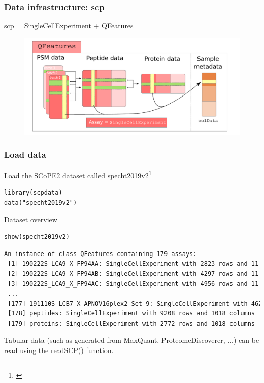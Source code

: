\documentclass{beamer}
\newcommand{\hcode}[2][lgray]{{\ttfamily\color{vdgray}\colorbox{#1}{#2}}}
\newcommand{\frametitlesection}[1]{\frametitle{\centering #1 \footnotesize \hspace{0pt plus 1 filll} \insertsection}}
\begin{document}
\begin{frame}
    \frametitlesection{Data infrastructure: scp}

    \hcode{scp} = \hcode{SingleCellExperiment} + \hcode{QFeatures}
    \begin{figure}
        \centering
        \includegraphics[width=\linewidth]{figs/SCP_framework.pdf}
    \end{figure}


\end{frame}

\begin{frame}[fragile]
    \frametitlesection{Load data}

    Load the SCoPE2 dataset called \hcode{specht2019v2}\footnote{\citet{Specht2019-jm}}

    \begin{lstlisting}
library(scpdata)
data("specht2019v2")
    \end{lstlisting}

    Dataset overview

    \begin{lstlisting}
show(specht2019v2)
    \end{lstlisting}

    \begin{lstlisting}[language = TeX, numbers = none, basicstyle = \tiny\ttfamily\color{vdgray}]
An instance of class QFeatures containing 179 assays:
 [1] 190222S_LCA9_X_FP94AA: SingleCellExperiment with 2823 rows and 11 col...
 [2] 190222S_LCA9_X_FP94AB: SingleCellExperiment with 4297 rows and 11 col...
 [3] 190222S_LCA9_X_FP94AC: SingleCellExperiment with 4956 rows and 11 col...
 ...
 [177] 191110S_LCB7_X_APNOV16plex2_Set_9: SingleCellExperiment with 4626 r...
 [178] peptides: SingleCellExperiment with 9208 rows and 1018 columns
 [179] proteins: SingleCellExperiment with 2772 rows and 1018 columns
    \end{lstlisting}

    \bigskip
    \footnotesize

    Tabular data (such as generated from MaxQuant, ProteomeDiscoverer,
    ...) can be read using the \hcode{readSCP()} function.

\end{frame}
\end{document}
